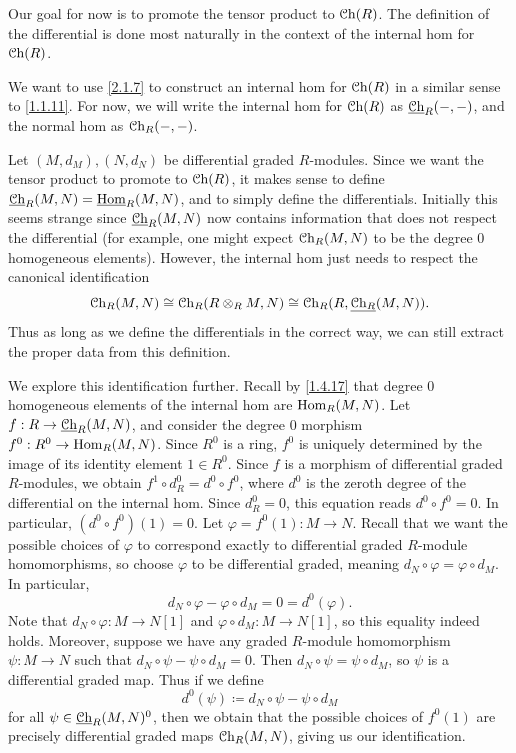 Our goal for now is to promote the tensor product to $\mathcal{C}\mathrm{h}(R) $. The definition of the differential is done most naturally in the context of the internal hom for $\mathcal{C}\mathrm{h}(R) $.

\begin{construction}\label{2.1.8}
	We want to use \cref{2.1.7} to construct an internal hom for $\mathcal{C}\mathrm{h}(R) $ in a similar sense to \cref{1.1.11}. For now, we will write the internal hom for $\mathcal{C}\mathrm{h}(R) $ as $\underline{\mathcal{C}\mathrm{h}}_R(-,-)$, and the normal hom as $\mathcal{C}\mathrm{h}_R(-,-)$.

	Let $(M,d_M),(N,d_N)$ be differential graded $R$-modules. Since we want the tensor product to promote to $\mathcal{C}\mathrm{h}(R) $, it makes sense to define $\underline{\mathcal{C}\mathrm{h}} _R(M,N) = \underline{\operatorname{Hom}} _R(M,N)$, and to simply define the differentials. Initially this seems strange since $\underline{\mathcal{C}\mathrm{h}}_R(M,N)$ now contains information that does not respect the differential (for example, one might expect $\mathcal{C}\mathrm{h}_R(M,N)$ to be the degree 0 homogeneous elements). However, the internal hom just needs to respect the canonical identification
	\[
		\mathcal{C}\mathrm{h}_R(M,N) \cong \mathcal{C}\mathrm{h}_R(R\otimes _RM,N) \cong \mathcal{C}\mathrm{h}_R(R,\underline{\mathcal{C}\mathrm{h}_R} (M,N))
	.\]
	Thus as long as we define the differentials in the correct way, we can still extract the proper data from this definition.

	We explore this identification further. Recall by \cref{1.4.17} that degree 0 homogeneous elements of the internal hom are $\operatorname{Hom}_R(M,N)$. Let $f : R \to \underline{\mathcal{C}\mathrm{h}}_R(M,N)$, and consider the degree 0 morphism $f^0 : R^0 \to \operatorname{Hom}_R(M,N) $. Since $R^0$ is a ring, $f^0$ is uniquely determined by the image of its identity element $1\in R^0$. Since $f$ is a morphism of differential graded $R$-modules, we obtain $f^1 \circ d_R^0 = d^0\circ f^0$, where $d^0$ is the zeroth degree of the differential on the internal hom. Since $d_R^0=0$, this equation reads $d^0 \circ f^0=0$. In particular, $(d^0\circ f^0)(1)=0$. Let $\varphi =f^0(1): M \to N$. Recall that we want the possible choices of $\varphi $ to correspond exactly to differential graded $R$-module homomorphisms, so choose $\varphi $ to be differential graded, meaning $d_N \circ \varphi =\varphi \circ d_M$. In particular,
	\[
		d_N \circ \varphi -\varphi \circ d_M = 0 = d^0(\varphi )
	.\]
	Note that $d_N \circ \varphi : M \to N[1]$ and $\varphi \circ d_M : M \to N[1]$, so this equality indeed holds. Moreover, suppose we have any graded $R$-module homomorphism $\psi : M \to N$ such that $d_N \circ \psi-\psi \circ d_M=0$. Then $d_N \circ \psi =\psi \circ d_M$, so $\psi $ is a differential graded map. Thus if we define
	\[
		d^0(\psi )\coloneqq d_N \circ \psi -\psi \circ d_M
	\]
	for all $\psi \in \underline{\mathcal{C}\mathrm{h}}_R(M,N)^0$, then we obtain that the possible choices of $f^0(1)$ are precisely differential graded maps $\mathcal{C}\mathrm{h}_R(M,N)$, giving us our identification.


\end{construction}
